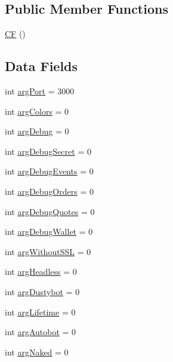 \subsection*{Public Member Functions}
\begin{DoxyCompactItemize}
\item 
\hyperlink{class_k_1_1_c_f_a5958a0f9f5083d45c036b0180ca70ebb}{CF} ()
\end{DoxyCompactItemize}
\subsection*{Data Fields}
\begin{DoxyCompactItemize}
\item 
int \hyperlink{class_k_1_1_c_f_ad8e21fbf694230c7356085f6a4c33946}{arg\+Port} = 3000
\item 
int \hyperlink{class_k_1_1_c_f_a4a280cd3b15e44c13dd04b093185f3d4}{arg\+Colors} = 0
\item 
int \hyperlink{class_k_1_1_c_f_adf3bd2e6fb3d053f4fbeb11b358355e7}{arg\+Debug} = 0
\item 
int \hyperlink{class_k_1_1_c_f_ab49089fd0430e11c5523a6266bcdeffb}{arg\+Debug\+Secret} = 0
\item 
int \hyperlink{class_k_1_1_c_f_a1d898d118f79784dbc862a2e89569b67}{arg\+Debug\+Events} = 0
\item 
int \hyperlink{class_k_1_1_c_f_a2573f341e6f95ab629a7ecefe25b657e}{arg\+Debug\+Orders} = 0
\item 
int \hyperlink{class_k_1_1_c_f_a7899599cb07687ad7b516452524f1ca0}{arg\+Debug\+Quotes} = 0
\item 
int \hyperlink{class_k_1_1_c_f_a15dc35f4e159f3ba1a145a89eef7ac46}{arg\+Debug\+Wallet} = 0
\item 
int \hyperlink{class_k_1_1_c_f_a71b0bc0bf8c0ade7768ed08a3163ae0b}{arg\+Without\+S\+SL} = 0
\item 
int \hyperlink{class_k_1_1_c_f_a4f93aa825293f552b554aa0f75eba23f}{arg\+Headless} = 0
\item 
int \hyperlink{class_k_1_1_c_f_a7a0670a55b62f58567ce174c4e2e7014}{arg\+Dustybot} = 0
\item 
int \hyperlink{class_k_1_1_c_f_acbb9fc24d192987c8caf829bfc12bec5}{arg\+Lifetime} = 0
\item 
int \hyperlink{class_k_1_1_c_f_ac2e0f5f7736fa94e4ae19da2bc1d9351}{arg\+Autobot} = 0
\item 
int \hyperlink{class_k_1_1_c_f_a3717f53c2ee309adbb6eec21c1d162c4}{arg\+Naked} = 0
\item 

\end{DoxyCompactItemize}
